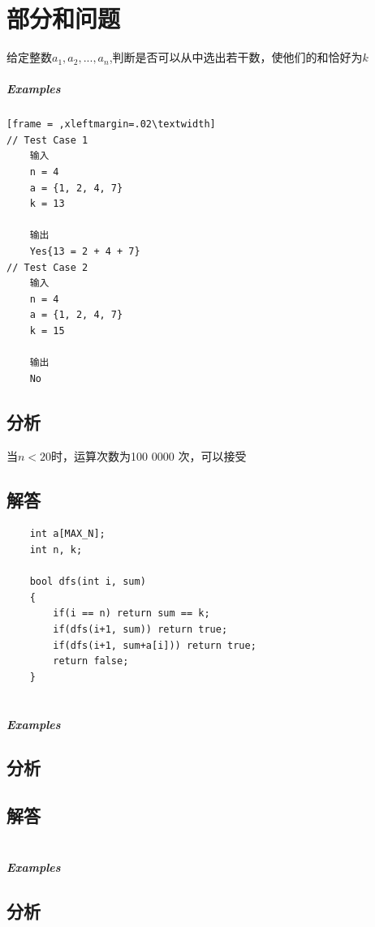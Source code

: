 \documentclass[UTF8,a4paper,12pt]{ctexbook}
\begin{document}
\section{部分和问题}
	给定整数$a_1, a_2,...,a_n$,判断是否可以从中选出若干数，使他们的和恰好为$k$
	\subparagraph{Examples}
		\begin{lstlisting}[frame = ,xleftmargin=.02\textwidth]
// Test Case 1
	输入
	n = 4
	a = {1, 2, 4, 7}
	k = 13
	
	输出
	Yes{13 = 2 + 4 + 7}
// Test Case 2
	输入
	n = 4
	a = {1, 2, 4, 7}
	k = 15
	
	输出
	No
		\end{lstlisting}
	\subsection{分析}
	
	当$n < 20$时，运算次数为100 0000 次，可以接受
	\subsection{解答}
		\begin{lstlisting}
	int a[MAX_N];
	int n, k;
	
	bool dfs(int i, sum)
	{
		if(i == n) return sum == k;
		if(dfs(i+1, sum)) return true;
		if(dfs(i+1, sum+a[i])) return true;
		return false;
	}
		\end{lstlisting}
	
\section{}
	
	\subparagraph{Examples}
	
	\subsection{分析}
	
	\subsection{解答}
	
\section{}
	
	\subparagraph{Examples}
	
	\subsection{分析}
	
\end{document}
